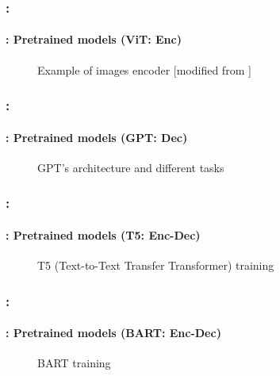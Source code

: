 \documentclass[xcolor=table]{beamer}
\begin{document}
\begin{frame}
	\frametitle{\insertshortsubtitle: \insertsection}
	\framesubtitle{\insertsubsection: Pretrained models (ViT: Enc) \cite{dosovitskiy2021an}}
	
	
	\vspace{-6pt}
	\begin{figure}[htp!]
		\centering
		\caption{Example of images encoder [modified from \cite{zhang2021dive}]}
	\end{figure}
	
\end{frame}


\begin{frame}
	\frametitle{\insertshortsubtitle: \insertsection}
	\framesubtitle{\insertsubsection: Pretrained models (GPT: Dec) \cite{radford2018improving}}
	
	\begin{figure}[htbp]
		\caption{GPT's architecture and different tasks \cite{radford2018improving}}
	\end{figure}
	
\end{frame}


\begin{frame}
	\frametitle{\insertshortsubtitle: \insertsection}
	\framesubtitle{\insertsubsection: Pretrained models (T5: Enc-Dec) \cite{T5}}
	
	\begin{figure}[htbp]
		\caption{T5 (Text-to-Text Transfer Transformer) training \cite{T5}}
	\end{figure}
	
\end{frame}

\begin{frame}
	\frametitle{\insertshortsubtitle: \insertsection}
	\framesubtitle{\insertsubsection: Pretrained models (BART: Enc-Dec) \cite{bart}}
	
	\begin{figure}[htbp]
		\centering
		\caption{BART training \cite{bart}}
	\end{figure}
	
\end{frame}
\end{document}
